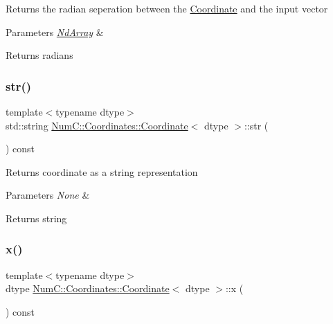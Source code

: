 Returns the radian seperation between the \mbox{\hyperlink{class_num_c_1_1_coordinates_1_1_coordinate}{Coordinate}} and the input vector


\begin{DoxyParams}{Parameters}
{\em \mbox{\hyperlink{class_num_c_1_1_nd_array}{Nd\+Array}}} & \\
\hline
\end{DoxyParams}
\begin{DoxyReturn}{Returns}
radians 
\end{DoxyReturn}
\mbox{\label{class_num_c_1_1_coordinates_1_1_coordinate_a285c36896b25a82f53ff44abcd971bc2}} 
\subsubsection{\texorpdfstring{str()}{str()}}
{\footnotesize\ttfamily template$<$typename dtype$>$ \\
std\+::string \mbox{\hyperlink{class_num_c_1_1_coordinates_1_1_coordinate}{Num\+C\+::\+Coordinates\+::\+Coordinate}}$<$ dtype $>$\+::str (\begin{DoxyParamCaption}{ }\end{DoxyParamCaption}) const\hspace{0.3cm}{\ttfamily [inline]}}

Returns coordinate as a string representation


\begin{DoxyParams}{Parameters}
{\em None} & \\
\hline
\end{DoxyParams}
\begin{DoxyReturn}{Returns}
string 
\end{DoxyReturn}
\mbox{\label{class_num_c_1_1_coordinates_1_1_coordinate_a1e5b9470d0049657b80e6a9e982228fd}} 
\subsubsection{\texorpdfstring{x()}{x()}}
{\footnotesize\ttfamily template$<$typename dtype$>$ \\
dtype \mbox{\hyperlink{class_num_c_1_1_coordinates_1_1_coordinate}{Num\+C\+::\+Coordinates\+::\+Coordinate}}$<$ dtype $>$\+::x (\begin{DoxyParamCaption}{ }\end{DoxyParamCaption}) const\hspace{0.3cm}{\ttfamily [inline]}}

